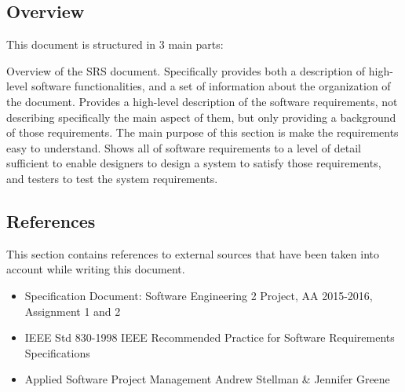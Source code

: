 \subsection{Overview}
This document is structured in 3 main parts:
\begin{itemize}
	 Overview of the SRS document. Specifically provides both a description of high-level software functionalities, and a set of information about the organization of the document.
	 Provides a high-level description of the software requirements, not describing specifically the main aspect of them, but only providing a background of those requirements. The main purpose of this section is make the requirements easy to understand.
	 Shows all of software requirements to a level of detail sufficient to enable designers to design a system to satisfy those requirements, and testers to test the system requirements.
\end{itemize}
\subsection{References}
This section contains references to external sources that have been taken into account while writing this document.
\begin{itemize}
	\item Specification Document: Software Engineering 2 Project, AA 2015-2016, Assignment 1 and 2
	\item IEEE Std 830-1998 IEEE Recommended Practice for Software Requirements Specifications
	\item Applied Software Project Management Andrew Stellman \& Jennifer Greene
\end{itemize}